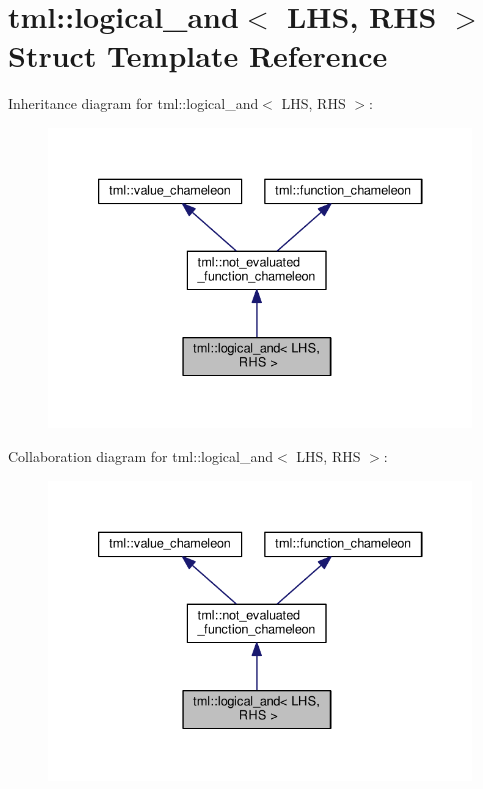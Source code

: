 \hypertarget{structtml_1_1logical__and}{\section{tml\+:\+:logical\+\_\+and$<$ L\+H\+S, R\+H\+S $>$ Struct Template Reference}
\label{structtml_1_1logical__and}
}


Inheritance diagram for tml\+:\+:logical\+\_\+and$<$ L\+H\+S, R\+H\+S $>$\+:
\nopagebreak
\begin{figure}[H]
\begin{center}
\leavevmode
\includegraphics[width=333pt]{structtml_1_1logical__and__inherit__graph}
\end{center}
\end{figure}


Collaboration diagram for tml\+:\+:logical\+\_\+and$<$ L\+H\+S, R\+H\+S $>$\+:
\nopagebreak
\begin{figure}[H]
\begin{center}
\leavevmode
\includegraphics[width=333pt]{structtml_1_1logical__and__coll__graph}
\end{center}
\end{figure}
